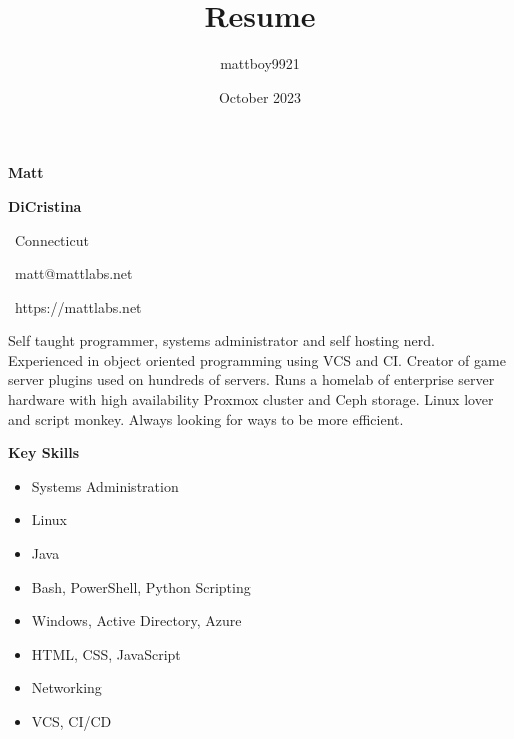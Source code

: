 \documentclass[letterpaper]{article}
\title{Resume}
\author{mattboy9921}
\date{October 2023}
\begin{document}
    \begin{minipage}{0.3\textwidth}
        \begin{tcolorbox}[colback=sidebar, frame empty, sharp corners=all]
            \begin{minipage}[t][0.973\textheight]{1.0\textwidth}
                \vspace{0.05\textheight}
                \textcolor{accent}{\textbf{{\Huge Matt}}}

                \vspace{0.01\textheight}
                \textcolor{accent}{\textbf{{\Huge DiCristina}}}

                \vspace{0.03\textheight}
                \makebox[1.5em][c]{\faMapMarker}\ Connecticut

                \makebox[1.5em][c]{\faEnvelope}\ matt@mattlabs.net

                \makebox[1.5em][c]{\faGlobe}\ https://mattlabs.net

                \vspace{0.02\textheight}
                \begin{flushleft}
                    Self taught programmer, systems administrator and self hosting nerd. Experienced in object oriented programming using VCS and CI.
                    Creator of game server plugins used on hundreds of servers. Runs a homelab of enterprise server hardware with high availability Proxmox cluster and Ceph storage.
                    Linux lover and script monkey. Always looking for ways to be more efficient.
                \end{flushleft}

                \vspace{0.02\textheight}
                \textcolor{accent}{\textbf{{\Large Key Skills}}}
                \begin{flushleft}
                    \begin{itemize}[leftmargin=1em, label=\textcolor{accent}{\textbullet}]
                        \item Systems Administration
                        \item Linux
                        \item Java
                        \item Bash, PowerShell, Python Scripting
                        \item Windows, Active Directory, Azure
                        \item HTML, CSS, JavaScript
                        \item Networking
                        \item VCS, CI/CD
                    \end{itemize}
                \end{flushleft}
            \end{minipage}
        \end{tcolorbox}
    \end{minipage}
\end{document}
